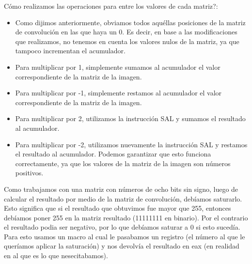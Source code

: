 \documentclass[a4paper, 10pt]{article}
\begin{document}
\newpage

\textquestiondown C\'omo realizamos las operaciones para entre los valores de cada matriz?:
\begin{itemize}
\item Como dijimos anteriormente, obviamos todos aqu\'ellas posiciones de la matriz de convoluci\'on en las que haya un 0. Es decir, en base a las modificaciones que realizamos, no tenemos en cuenta los valores nulos de la matriz, ya que tampoco incrementan el acumulador.
\item Para multiplicar por 1, simplemente sumamos al acumulador el valor correspondiente de la matriz de la imagen.
\item Para multiplicar por -1, simplemente restamos al acumulador el valor correspondiente de la matriz de la imagen.
\item Para multiplicar por 2, utilizamos la instrucci\'on SAL y sumamos el resultado al acumulador.
\item Para multiplicar por -2, utilizamos nuevamente la instrucci\'on SAL y restamos el resultado al acumulador. Podemos garantizar que esto funciona correctamente, ya que los valores de la matriz de la imagen son n\'umeros positivos. \\
\end{itemize}

Como trabajamos con una matriz con n\'umeros de ocho bits sin signo, luego de calcular el resultado por medio de la matriz de convoluci\'on, deb\'iamos saturarlo. Esto significa que si el resultado que obtuvimos fue mayor que 255, entonces deb\'iamos poner 255 en la matriz resultado (11111111 en binario). Por el contrario el resultado podia ser negativo, por lo que deb\'iamos saturar a 0 si esto suced\'ia. Para esto usamos un macro al cual le pasabamos un registro (el n\'umero al que le quer\'iamos aplicar la saturaci\'on) y nos devolv\'ia el resultado en eax (en realidad en al que es lo que nesecitabamos). \\ 
\end{document}
